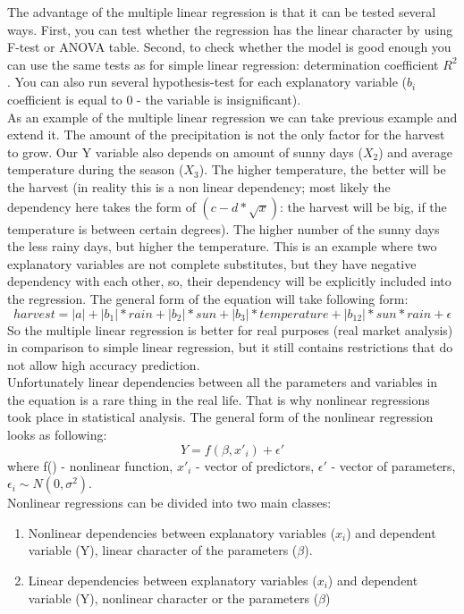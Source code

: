 \documentclass[12pt, a4paper]{article}
\begin{document}
The advantage of the multiple linear regression is that it can be tested several ways. First, you can test whether the regression has the linear character by using F-test or ANOVA table. Second, to check whether the model is good enough you can use the same tests as for simple linear regression: determination coefficient $R^2$. You can also run several hypothesis-test for each explanatory variable ($b_{i}$ coefficient is equal to 0 - the variable is insignificant).\\
As an example of the multiple linear regression we can take previous example and extend it. The amount of the precipitation is not the only factor for the harvest to grow. Our Y variable also depends on amount of sunny days ($X_{2}$) and average temperature during the season ($X_{3}$). The higher temperature, the better will be the harvest (in reality this is a non linear dependency; most likely the dependency here takes the form of $(c-d*\sqrt{x})$: the harvest will be big, if the temperature is between certain degrees). The higher number of the sunny days the less rainy days, but higher the temperature. This is an example where two explanatory variables are not complete substitutes, but they have negative dependency with each other, so, their dependency will be explicitly included into the regression. The general form of the equation will take following form:
\[harvest = |a| + |b_{1}|*rain + |b_{2}|*sun + |b_{3}|*temperature + |b_{12}|*sun*rain + \epsilon\]
So the multiple linear regression is better for real purposes (real market analysis) in comparison to simple linear regression, but it still contains restrictions that do not allow high accuracy prediction.\\
Unfortunately linear dependencies between all the parameters and variables in the equation is a rare thing in the real life. That is why nonlinear regressions took place in statistical analysis. The general form of the nonlinear regression looks as following:
\[Y = f(\beta, x'_{i}) + \epsilon'\]
where f() - nonlinear function, $x'_{i}$ - vector of predictors, $\epsilon'$ - vector of parameters, $\epsilon_{i} \sim N(0, \sigma^2)$.\\
Nonlinear regressions can be divided into two main classes:
\begin{enumerate}
	\item Nonlinear dependencies between explanatory variables ($x_{i}$) and dependent variable (Y), linear character of the parameters ($\beta$).
	\item Linear dependencies between explanatory variables ($x_{i}$) and dependent variable (Y), nonlinear character or the parameters ($\beta$) 
\end{enumerate} 
\end{document}
